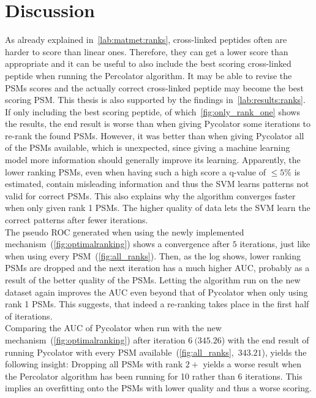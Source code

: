 
\chapter{Discussion}
\label{discussion}
As already explained in~\ref{lab:matmet:ranks}, cross-linked peptides often are harder to score than linear ones. Therefore, they can get a lower score than appropriate and it can be useful to also include the best scoring cross-linked peptide when running the Percolator algorithm. It may be able to revise the PSMs scores and the actually correct cross-linked peptide may become the best scoring PSM. This thesis is also supported by the findings in~\ref{lab:results:ranks}. If only including the best scoring peptide, of which~\ref{fig:only_rank_one} shows the results, the end result is worse than when giving Pycolator some iterations to re-rank the found PSMs. However, it was better than when giving Pycolator all of the PSMs available, which is unexpected, since giving a machine learning model more information should generally improve its learning. Apparently, the lower ranking PSMs, even when having such a high score a q-value of $\leq5\%$ is estimated, contain misleading information and thus the SVM learns patterns not valid for correct PSMs. This also explains why the algorithm converges faster when only given rank 1 PSMs. The higher quality of data lets the SVM learn the correct patterns after fewer iterations. \\
The pseudo ROC generated when using the newly implemented mechanism~(\ref{fig:optimalranking}) shows a convergence after $5$ iterations, just like when using every PSM~(\ref{fig:all_ranks}). Then, as the log shows, lower ranking PSMs are dropped and the next iteration has a much higher AUC, probably as a result of the better quality of the PSMs. Letting the algorithm run on the new dataset again improves the AUC even beyond that of Pycolator when only using rank 1 PSMs. This suggests, that indeed a re-ranking takes place in the first half of iterations.\\
Comparing the AUC of Pycolator when run with the new mechanism~(\ref{fig:optimalranking}) after iteration $6~(345.26$) with the end result of running Pycolator with every PSM available~(\ref{fig:all_ranks},~$343.21$), yields the following insight: Dropping all PSMs with rank $2+$ yields a worse result when the Percolator algorithm has been running for 10 rather than 6 iterations. This implies an overfitting onto the PSMs with lower quality and thus a worse scoring.\\\\

